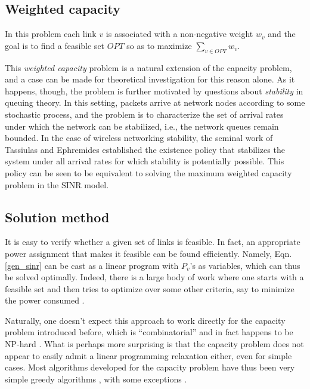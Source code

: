 \documentclass[11pt]{amsart}
\begin{document}
\subsection*{Weighted capacity}
In this problem each link $v$ is associated with a non-negative weight $w_v$ and the goal is to find a feasible
set $OPT$ so as to maximize $\sum_{v \in OPT}  w_v$.

This \emph{weighted capacity} problem is a natural extension of the capacity problem, and a case can
be made for theoretical investigation for this reason alone.
As it happens, though, the problem is further motivated by questions about \emph{stability} in queuing theory. 
In this setting, packets arrive at network nodes according to some stochastic process, and the problem is
to characterize the set of arrival rates under which the network can be stabilized, i.e., the network queues
remain bounded. In the case of 
wireless networking stability, the seminal work of Tassiulas and Ephremides \cite{TE92} 
established
the existence policy that
stabilizes the system under all arrival rates for which stability is potentially possible. 
This policy can be seen to be equivalent to solving the maximum
weighted capacity problem in the SINR model. 

\subsection*{Solution method}

It is easy to verify whether a given set of links is feasible. 
In fact, an appropriate power assignment that makes it feasible can be found efficiently. Namely, Eqn. \ref{gen_sinr} can be cast as a linear program with $P_v$'s as variables, 
which can thus be solved optimally. Indeed, there is a large body of work where one starts with a feasible set and then tries to optimize over some other criteria, say to minimize the power consumed \cite{ChiangSurvey}. 

Naturally, one doesn't expect this approach to work directly for the capacity problem introduced before, which is  ``combinatorial'' and in fact happens to be NP-hard \cite{Goussevskaia2008Complexity}.
What is perhaps more surprising is that the capacity problem does not appear to easily admit a linear
programming relaxation either, even for simple cases. Most algorithms developed for the capacity problem have thus been very simple greedy algorithms \cite{GHWW09,SODA11,KesselheimSoda11}, with some exceptions \cite{hoeferspaa,CKMPS08}.
\end{document}
